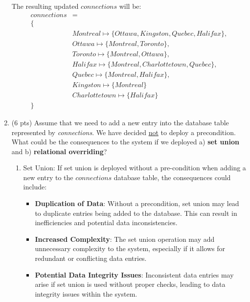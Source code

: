 \documentclass[12pt]{article}
\begin{document}
\begin{spacing}{1.5}
\begin{enumerate}
		      	The resulting updated $connections$ will be:
		      	\begin{align*}
		      	connections & =                                                       \\
		      	\{ \\
		      	            & Montreal \mapsto \{Ottawa, Kingston, Quebec, Halifax\}, \\
		      	            & Ottawa \mapsto \{Montreal, Toronto\},                   \\
		      	            & Toronto \mapsto \{Montreal, Ottawa\},                   \\
		      	            & Halifax \mapsto \{Montreal, Charlottetown, Quebec\},                                 \\
		      	            & Quebec \mapsto \{Montreal, Halifax\},                   \\
		      	            & Kingston \mapsto \{Montreal\}                           \\
                            & Charlottetown \mapsto \{Halifax\}
                                              \\
		      	\}
		      \end{align*}
		      
		\item (6 pts) Assume that we need to add a new entry into the database table represented by \textit{connections}. We have decided \underline{not} to deploy a precondition. What could be the consequences to the system if we deployed a) \textbf{set union} and b) \textbf{relational overriding}?\newline

        \begin{enumerate}
            \item Set Union:
            If set union is deployed without a pre-condition when adding a new entry to the $connections$ database table, the consequences could include:

            \begin{itemize}
                \item \textbf{Duplication of Data}: Without a precondition, set union may lead to duplicate entries being added to the database. This can result in inefficiencies and potential data inconsistencies.
                \item \textbf{Increased Complexity}: The set union operation may add unnecessary complexity to the system, especially if it allows for redundant or conflicting data entries.
                \item \textbf{Potential Data Integrity Issues}: Inconsistent data entries may arise if set union is used without proper checks, leading to data integrity issues within the system.  
            \end{itemize}


\end{enumerate}
\end{enumerate}
\end{spacing}
\end{document}

